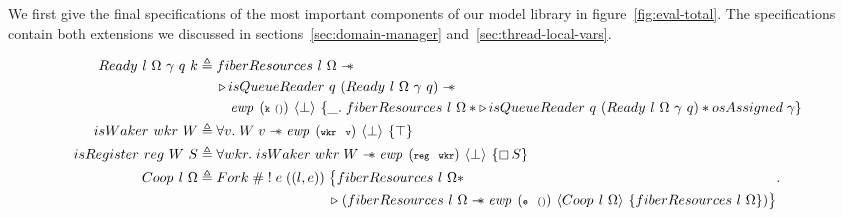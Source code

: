 We first give the final specifications of the most important components of our model library in figure~\ref{fig:eval-total}.
The specifications contain both extensions we discussed in sections~\ref{sec:domain-manager} and~\ref{sec:thread-local-vars}.

\begin{figure}[ht]
    \begin{align*}
        \gsReady{}~l~\Omega~\gamma~q~k & \triangleq \begin{aligned}[t]
                                                         & \gsFiberResources{l}{\Omega} \wand                                                                                                           \\
                                                         & \later isQueueReader~q~(\gsReady{}~l~\Omega~\gamma~q) \wand                                                                                  \\
                                                         & \quad \ewp{k~()}{\bot}{\_.\; \gsFiberResources{l}{\Omega} \ast \later isQueueReader~q~(\gsReady{}~l~\Omega~\gamma~q) \ast \gspdone{\gamma} }
                                                    \end{aligned} \\
        \gsIsWaker{}~wkr~W             & \triangleq \forall v.   \;  W\; v \wand{} \ewp{wkr\ \ v}{\bot}{\top}                                                                                                \\
        \gsIsReg{}~reg~W~S             & \triangleq \forall wkr. \; \gsIsWaker{}\; wkr\; W \wand{} \ewp{reg\ \ wkr}{\bot}{\always S}                                                                         \\
        \proto{}~l~\Omega              & \triangleq \begin{aligned}[t]
                                                        Fork\;       & \#\; \begin{aligned}[t]
                                     & !\; e\; ((l, e))\; \begin{aligned}[t]
                                           & \big\{ \gsFiberResources{l}{\Omega} \ast                                                                              \\
                                           & \later\; (\gsFiberResources{l}{\Omega} \wand{} \ewp{e\ \ ()}{\proto{}~l~\Omega}{\gsFiberResources{l}{\Omega}}) \big\}
                                      \end{aligned} . \\

\end{aligned}
\end{aligned}
\end{align*}
\end{figure}
